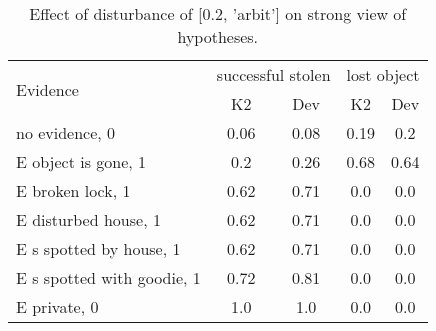 \begin{table}\begin{tabular}{l|cc|cc}\toprule\multirow{2}{*}{Evidence} & \multicolumn{2}{c}{successful stolen}& \multicolumn{2}{c}{lost object}\\& {K2} & {Dev}& {K2} & {Dev}\\\midrule
no evidence, 0 & 0.06&0.08&0.19&0.2\\E object is gone, 1 & \cellcolor{Bittersweet}0.2&\cellcolor{Bittersweet}0.26&0.68&0.64\\E broken lock, 1 & \cellcolor{Bittersweet}0.62&\cellcolor{Bittersweet}0.71&0.0&0.0\\E disturbed house, 1 & \cellcolor{Bittersweet}0.62&\cellcolor{Bittersweet}0.71&0.0&0.0\\E s spotted by house, 1 & \cellcolor{Bittersweet}0.62&\cellcolor{Bittersweet}0.71&0.0&0.0\\E s spotted with goodie, 1 & \cellcolor{Bittersweet}0.72&\cellcolor{Bittersweet}0.81&0.0&0.0\\E private, 0 & 1.0&1.0&0.0&0.0\\\bottomrule\end{tabular}\caption{Effect of disturbance of [0.2, 'arbit'] on strong view of hypotheses.}\end{table}